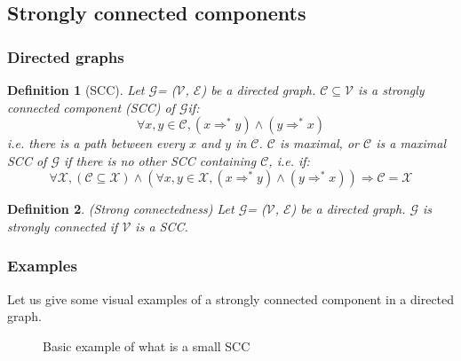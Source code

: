 \documentclass[a4 paper, 12pt]{article}
\def\GG{\ensuremath{\mathcal{G}}}
\def\VV{\ensuremath{\mathcal{V}}}
\def\EE{\ensuremath{\mathcal{E}}}
\newtheorem{definition}{Definition}
\begin{document}
\subsection{Strongly connected components}
\subsubsection{Directed graphs}\label{sec:directedgraphs}

\begin{definition}[SCC]
    Let \GG = (\VV, \EE) be a directed graph.
$\mathcal{C} \subseteq \mathcal{V}$ is a strongly connected component (SCC) of \GG if:
\begin{equation*}
    \forall x, y \in \mathcal{C}, (x \Rightarrow^* y) \wedge (y \Rightarrow^* x)
\end{equation*}
\textit{i.e.} there is a path between every $x$ and $y$ in $\mathcal{C}$.
\BlankLine
$\mathcal{C}$ is maximal, or $\mathcal{C}$ is a maximal SCC of \GG \xspace if there is no other SCC containing $\mathcal{C}$, \textit{i.e.} if:
\begin{equation*}
    \forall \mathcal{X}, (\mathcal{C} \subseteq \mathcal{X}) \wedge (\forall x, y \in \mathcal{X}, (x \Rightarrow^* y) \wedge (y \Rightarrow^* x)) \Longrightarrow \mathcal{C} = \mathcal{X}
\end{equation*}
\end{definition}

\begin{definition}(Strong connectedness)
Let \GG = (\VV, \EE) be a directed graph. \GG \xspace is strongly connected if \VV \xspace is a SCC.
\end{definition}

\subsubsection{Examples}
Let us give some visual examples of a strongly connected component in a directed graph.

\begin{figure}[!h]
    \centering
    \begin{subfigure}[t]{.49\textwidth}
        \label{fig:example1_a}
    \end{subfigure}
    \begin{subfigure}[t]{.49\textwidth}
        \label{fig:example1_b}
    \end{subfigure}
    \caption{Basic example of what is a small SCC}\label{fig:example1}
\end{figure}
\end{document}
